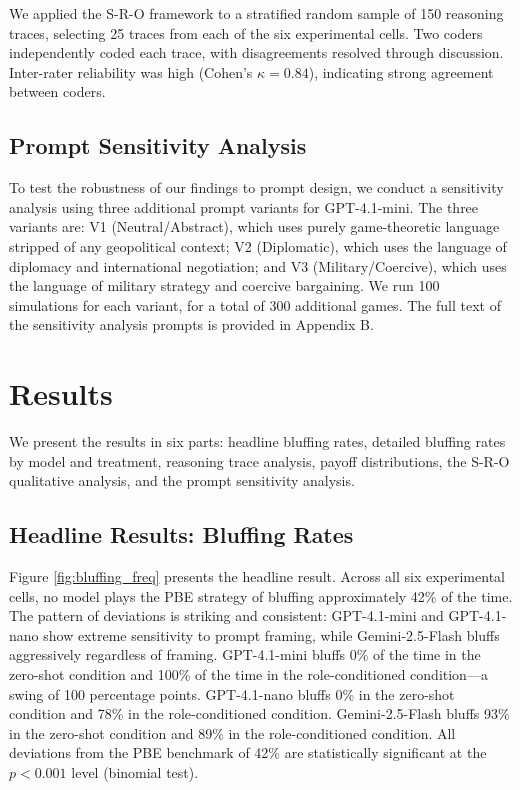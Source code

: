 \documentclass[12pt]{article}
\theoremstyle{plain}
\theoremstyle{definition}
\begin{document}
We applied the S-R-O framework to a stratified random sample of 150 reasoning traces, selecting 25 traces from each of the six experimental cells. Two coders independently coded each trace, with disagreements resolved through discussion. Inter-rater reliability was high (Cohen's $\kappa = 0.84$), indicating strong agreement between coders.

\subsection{Prompt Sensitivity Analysis}

To test the robustness of our findings to prompt design, we conduct a sensitivity analysis using three additional prompt variants for GPT-4.1-mini. The three variants are: V1 (Neutral/Abstract), which uses purely game-theoretic language stripped of any geopolitical context; V2 (Diplomatic), which uses the language of diplomacy and international negotiation; and V3 (Military/Coercive), which uses the language of military strategy and coercive bargaining. We run 100 simulations for each variant, for a total of 300 additional games. The full text of the sensitivity analysis prompts is provided in Appendix B.

\section{Results}

We present the results in six parts: headline bluffing rates, detailed bluffing rates by model and treatment, reasoning trace analysis, payoff distributions, the S-R-O qualitative analysis, and the prompt sensitivity analysis.

\subsection{Headline Results: Bluffing Rates}

Figure \ref{fig:bluffing_freq} presents the headline result. Across all six experimental cells, no model plays the PBE strategy of bluffing approximately 42\% of the time. The pattern of deviations is striking and consistent: GPT-4.1-mini and GPT-4.1-nano show extreme sensitivity to prompt framing, while Gemini-2.5-Flash bluffs aggressively regardless of framing. GPT-4.1-mini bluffs 0\% of the time in the zero-shot condition and 100\% of the time in the role-conditioned condition---a swing of 100 percentage points. GPT-4.1-nano bluffs 0\% in the zero-shot condition and 78\% in the role-conditioned condition. Gemini-2.5-Flash bluffs 93\% in the zero-shot condition and 89\% in the role-conditioned condition. All deviations from the PBE benchmark of 42\% are statistically significant at the $p < 0.001$ level (binomial test).
\end{document}
